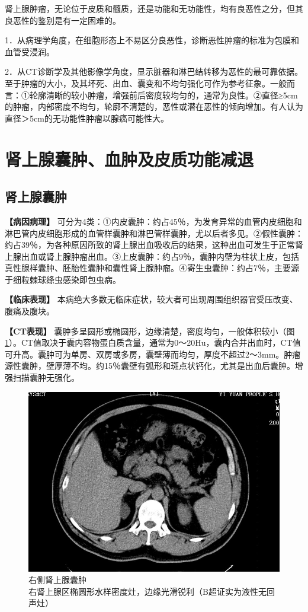 肾上腺肿瘤，无论位于皮质和髓质，还是功能和无功能性，均有良恶性之分，但其良恶性的鉴别是有一定困难的。

1．从病理学角度，在细胞形态上不易区分良恶性，诊断恶性肿瘤的标准为包膜和血管受浸润。

2．从CT诊断学及其他影像学角度，显示脏器和淋巴结转移为恶性的最可靠依据。至于肿瘤的大小，及其坏死、出血、囊变和不均匀强化可作为参考征象。一般而言：①轮廓清晰的较小肿瘤，增强前后密度较均匀的，通常为良性。②直径≥5cm的肿瘤，内部密度不均匀，轮廓不清楚的，恶性或潜在恶性的倾向增加。有人认为直径＞5cm的无功能性肿瘤以腺癌可能性大。

\section{肾上腺囊肿、血肿及皮质功能减退}

\subsection{肾上腺囊肿}

\textbf{【病因病理】}
可分为4类：①内皮囊肿：约占45％，为发育异常的血管内皮细胞和淋巴管内皮细胞形成的血管样囊肿和淋巴管样囊肿，尤以后者多见。②假性囊肿：约占39％，为各种原因所致的肾上腺出血吸收后的结果，这种出血可发生于正常肾上腺出血或肾上腺肿瘤出血。③上皮囊肿：约占9％，囊肿内壁为柱状上皮，包括真性腺样囊肿、胚胎性囊肿和囊性肾上腺肿瘤。④寄生虫囊肿：约占7％，主要源于细粒棘球绦虫感染即包虫病。

\textbf{【临床表现】}
本病绝大多数无临床症状，较大者可出现周围组织器官受压改变、腹痛及腹块。

\textbf{【CT表现】}
囊肿多呈圆形或椭圆形，边缘清楚，密度均匀，一般体积较小（图\ref{fig16-6}）。CT值取决于囊内容物蛋白质含量，通常为0～20Hu，囊内合并出血时，CT值可升高。囊肿可为单房、双房或多房，囊壁薄而均匀，厚度不超过2～3mm。肿瘤源性囊肿，壁厚薄不均。约15％囊壁有弧形和斑点状钙化，尤其是出血后囊肿。增强扫描囊肿无强化。

\begin{figure}[!htbp]
 \centering
 \includegraphics[width=.7\textwidth,height=\textheight,keepaspectratio]{./images/Image00350.jpg}
 \captionsetup{justification=centering}
 \caption{右侧肾上腺囊肿\\{\small 右肾上腺区椭圆形水样密度灶，边缘光滑锐利（B超证实为液性无回声灶）}}
 \label{fig16-6}
  \end{figure} 

